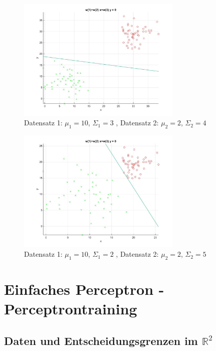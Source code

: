\documentclass[]{report}
\begin{document}
\begin{figure}[p]
\includegraphics[width=0.7\textwidth]{./images/MyPerceptron_3.jpg}
\caption{Datensatz 1: $\mu_1=10$, $\Sigma_1=3$ , Datensatz 2: $\mu_2=2$, $\Sigma_2=4$}
\end{figure}

\begin{figure}[p]
\includegraphics[width=0.7\textwidth]{./images/MyPerceptron_4.jpg}
\caption{Datensatz 1: $\mu_1=10$, $\Sigma_1=2$ , Datensatz 2: $\mu_2=2$, $\Sigma_2=5$}
\end{figure}


\section{Einfaches Perceptron - Perceptrontraining}

\subsection{Daten und Entscheidungsgrenzen im $\mathbb{R}^2$}
\end{document}
